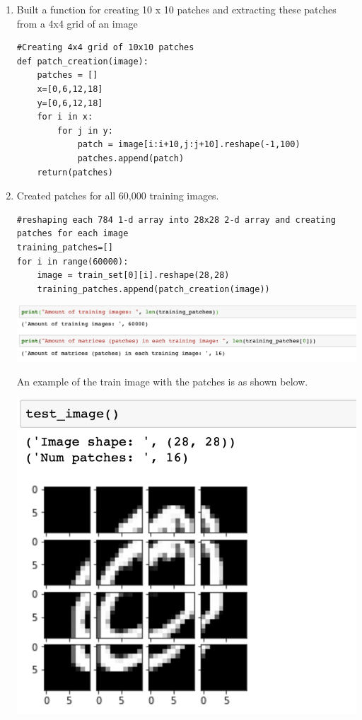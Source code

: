 \documentclass{article}      %
\begin{document}
\begin{enumerate}[label=(\alph*)]
\item Built a function for creating 10 x 10 patches and extracting these patches from a 4x4 grid of an image

\begin{lstlisting}
#Creating 4x4 grid of 10x10 patches
def patch_creation(image):
    patches = []
    x=[0,6,12,18]
    y=[0,6,12,18]
    for i in x:
        for j in y:
            patch = image[i:i+10,j:j+10].reshape(-1,100)
            patches.append(patch)
    return(patches)
\end{lstlisting}

\item Created patches for all 60,000 training images. 

\begin{lstlisting}
#reshaping each 784 1-d array into 28x28 2-d array and creating patches for each image
training_patches=[]
for i in range(60000):
    image = train_set[0][i].reshape(28,28)
    training_patches.append(patch_creation(image))
\end{lstlisting}

\includegraphics[width=\textwidth]{trainingimages}

An example of the train image with the patches is as shown below.

\includegraphics[width=\textwidth]{testimage}


\end{enumerate}
\end{document}
